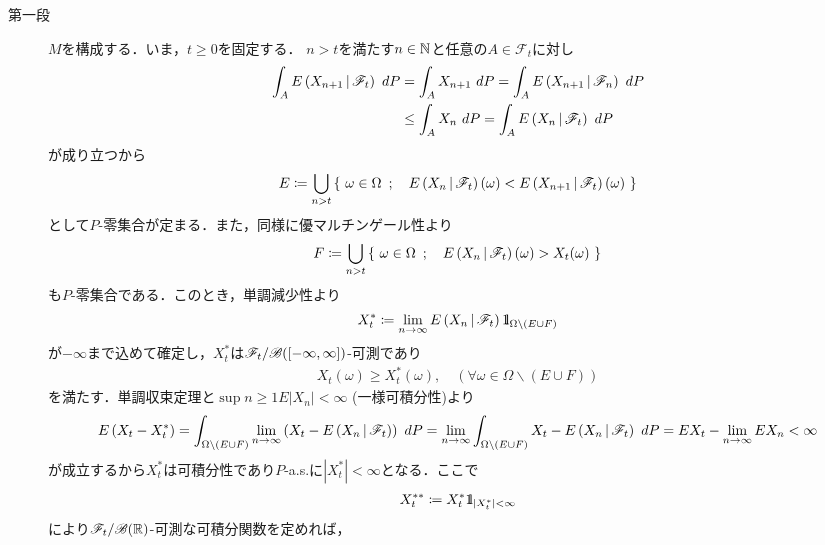  	\begin{prf}\mbox{}
		\begin{description}
			\item[第一段] $M$を構成する．いま，$t \geq 0$を固定する．
				$n > t$を満たす$n \in \mathbb{N}$と任意の$A \in \mathscr{F}_t$に対し
 				\begin{align}
 					\int_A E\left( X_{n+1} \, \middle|\, \mathscr{F}_t \right)\ dP
 					&= \int_A X_{n+1}\ dP
 					= \int_A E\left( X_{n+1} \, \middle|\, \mathscr{F}_n \right)\ dP \\
		 			&\leq \int_A X_n\ dP
 					= \int_A E\left( X_n \, \middle|\, \mathscr{F}_t \right)\ dP
 				\end{align}
 				が成り立つから
 				\begin{align}
 					E \coloneqq \bigcup_{n > t}\left\{\ \omega \in \Omega\ \, ; \quad E\left( X_n \, \middle|\, \mathscr{F}_t \right)(\omega) < E\left( X_{n+1} \, \middle|\, \mathscr{F}_t \right)(\omega)\ \right\}
 				\end{align}
 				として$P$-零集合が定まる．また，同様に優マルチンゲール性より
 				\begin{align}
 					F \coloneqq \bigcup_{n > t}\left\{\ \omega \in \Omega\ \, ; \quad E\left( X_n \, \middle|\, \mathscr{F}_t \right)(\omega) > X_t(\omega)\ \right\}
 				\end{align}
 				も$P$-零集合である．このとき，単調減少性より
 				\begin{align}
 					X^*_t \coloneqq \lim_{n \to \infty} E\left( X_n \, \middle|\, \mathscr{F}_t \right) \mbox{1}\hspace{-0.25em}\mbox{l}_{\Omega \backslash (E \cup F)}
 				\end{align}
 				が$-\infty$まで込めて確定し，$X^*_t$は$\mathscr{F}_t/\mathscr{B}([-\infty,\infty])$-可測であり
 				\begin{align}
 					X_t(\omega) \geq X^*_t(\omega), \quad (\forall \omega \in \Omega \backslash (E \cup F))
 				\end{align}
 				を満たす．単調収束定理と$\sup{n \geq 1}{E|X_n|} < \infty$ (一様可積分性)より
 				\begin{align}
 					E\left( X_t - X^*_t \right)
 					= \int_{\Omega \backslash (E \cup F)} \lim_{n \to \infty} \left( X_t - E\left( X_n \, \middle|\, \mathscr{F}_t \right) \right)\ dP
 					= \lim_{n \to \infty} \int_{\Omega \backslash (E \cup F)} X_t - E\left( X_n \, \middle|\, \mathscr{F}_t \right)\ dP
 					= E X_t - \lim_{n \to \infty} EX_n < \infty
 				\end{align}
 				が成立するから$X^*_t$は可積分性であり$P$-a.s.に$|X^*_t| <\infty$となる．ここで
 				\begin{align}
 					X^{**}_t \coloneqq X^*_t \mbox{1}\hspace{-0.25em}\mbox{l}_{|X^*_t| < \infty}
 				\end{align}
 				により$\mathscr{F}_t/\mathscr{B}(\mathbb{R})$-可測な可積分関数を定めれば，

\end{description}
\end{prf}
